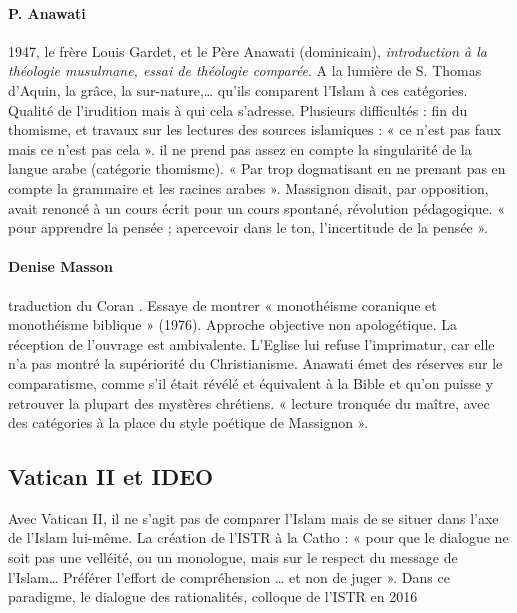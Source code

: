 \paragraph{P. Anawati}
1947,  le frère Louis Gardet,  et le Père Anawati (dominicain), \emph{introduction à la théologie musulmane, essai de théologie comparée}. A la lumière de S. Thomas d’Aquin, la grâce, la sur-nature,… qu’ils comparent l’Islam à ces catégories. Qualité de l’irudition mais à qui cela s’adresse. Plusieurs difficultés : fin du thomisme, et travaux sur les lectures des sources islamiques : « ce n’est pas faux mais ce n’est pas cela ». il ne prend pas assez en compte la singularité de la langue arabe (catégorie thomisme). « Par trop dogmatisant en ne prenant pas en compte la grammaire et les racines arabes ».  Massignon disait, par opposition, avait renoncé à un cours écrit pour un cours spontané, révolution pédagogique. « pour apprendre la pensée ; apercevoir dans le ton, l’incertitude de la pensée ». 
\paragraph{Denise Masson} traduction du Coran . Essaye de montrer « monothéisme coranique et monothéisme biblique » (1976). Approche objective non apologétique. La réception de l’ouvrage est ambivalente. L’Eglise lui refuse l’imprimatur, car elle n’a pas montré la supériorité du Christianisme. Anawati émet des réserves sur le comparatisme, comme s’il était révélé et équivalent à la Bible et qu’on puisse y retrouver la plupart des mystères chrétiens. « lecture tronquée du maître, avec des catégories à la place du style poétique de Massignon ». 
\subsection{Vatican II et IDEO} Avec Vatican II, il ne s’agit pas de comparer l’Islam mais de se situer dans l’axe de l’Islam lui-même. La création de l’ISTR à la Catho : « pour que le dialogue ne soit pas une velléité, ou un monologue, mais sur le respect du message de l’Islam… Préférer l’effort de compréhension … et non de juger ». Dans ce paradigme, le dialogue des rationalités, colloque de l’ISTR en 2016

